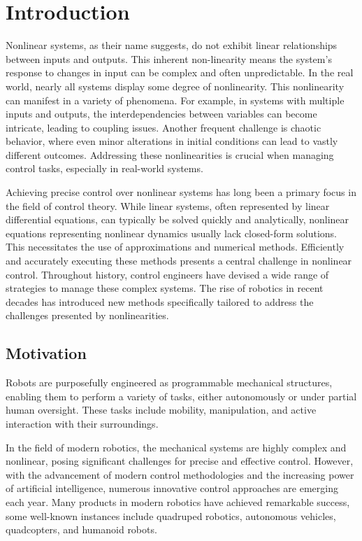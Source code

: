 \chapter{Introduction}
Nonlinear systems\cite{sastry2013nonlinear}, as their name suggests, do not exhibit linear relationships between inputs and outputs. This inherent non-linearity means the system's response to changes in input can be complex and often unpredictable. In the real world, nearly all systems display some degree of nonlinearity. This nonlinearity can manifest in a variety of phenomena. For example, in systems with multiple inputs and outputs, the interdependencies between variables can become intricate, leading to coupling issues. Another frequent challenge is chaotic behavior\cite{ditto1995principles}\cite{oestreicher2007history}, where even minor alterations in initial conditions can lead to vastly different outcomes. Addressing these nonlinearities is crucial when managing control tasks, especially in real-world systems.

Achieving precise control over nonlinear systems\cite{iqbal2017nonlinear} has long been a primary focus in the field of control theory. While linear systems, often represented by linear differential equations, can typically be solved quickly and analytically, nonlinear equations representing nonlinear dynamics usually lack closed-form solutions\cite{struble2018nonlinear}. This necessitates the use of approximations and numerical methods. Efficiently and accurately executing these methods presents a central challenge in nonlinear control. Throughout history, control engineers have devised a wide range of strategies to manage these complex systems. The rise of robotics in recent decades has introduced new methods specifically tailored to address the challenges presented by nonlinearities.

\section{Motivation}
Robots are purposefully engineered as programmable mechanical structures, enabling them to perform a variety of tasks, either autonomously or under partial human oversight. These tasks include mobility, manipulation, and active interaction with their surroundings.

In the field of modern robotics, the mechanical systems are highly complex and nonlinear, posing significant challenges for precise and effective control. However, with the advancement of modern control methodologies and the increasing power of artificial intelligence, numerous innovative control approaches are emerging each year. Many products in modern robotics have achieved remarkable success, some well-known instances include quadruped robotics\cite{biswal2021development}, autonomous vehicles\cite{schwarting2018planning}, quadcopters\cite{luukkonen2011modelling}, and humanoid robots\cite{saeedvand2019comprehensive}.


